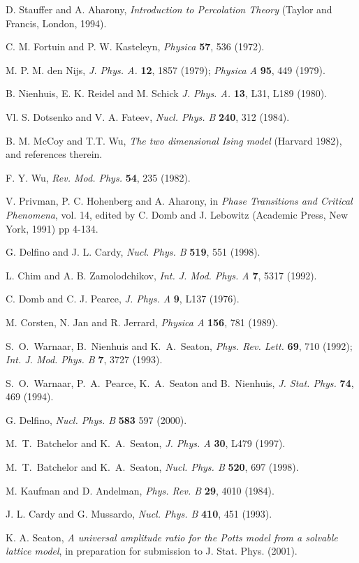 \documentclass[a4paper,a4paper]{article}
\begin{document}
 
\begin{thebibliography}{99}

D. Stauffer and A. Aharony, {\it Introduction to Percolation Theory} 
(Taylor and 
Francis, London, 1994).

 C. M. Fortuin and P. W. Kasteleyn, {\it Physica} {\bf 57}, 
536 (1972).

M. P. M. den Nijs, {\it J. Phys. A.} {\bf 12}, 1857 (1979);
{\it Physica A} {\bf 95}, 449 (1979).

B. Nienhuis, E. K. Reidel and M. Schick {\it J. Phys. A.} 
{\bf 13}, L31, L189 (1980).

 Vl. S. Dotsenko and V. A. Fateev, {\it Nucl. Phys. B} {\bf 240}, 
312 (1984).

 B. M. McCoy and T.T. Wu, {\it The two dimensional Ising model}
(Harvard 1982), and references therein.

 F. Y. Wu, {\it Rev. Mod. Phys.} {\bf 54}, 235 (1982).

 V. Privman, P. C. Hohenberg and A. Aharony,
in {\it Phase Transitions and Critical Phenomena}, vol. 14, edited by C. Domb
and J. Lebowitz (Academic Press, New York, 1991) pp 4-134.

 G. Delfino and J. L. Cardy, {\it  Nucl. Phys. B} 
{\bf 519}, 551 (1998).

 L. Chim and A. B. Zamolodchikov, {\it Int. J. Mod. Phys. A}
 {\bf 7}, 5317 (1992). 

 C. Domb and C. J. Pearce, {\it J. Phys. A} {\bf 9}, L137 (1976).

 M. Corsten, N. Jan and R. Jerrard, {\it Physica A} {\bf 156},
781 (1989).

S.~O.~Warnaar, B.~Nienhuis and K.~A.~Seaton,
{\it Phys. Rev. Lett.} {\bf 69}, 710 (1992); 
{\it Int. J. Mod. Phys. B} {\bf 7}, 3727 (1993).

S.~O.~Warnaar, P.~A.~Pearce, K.~A.~Seaton and B.~Nienhuis,
{\it J. Stat. Phys.} {\bf 74},  469 (1994).

 G. Delfino, {\it Nucl. Phys. B} {\bf 583} 597 (2000).

M.~T.~Batchelor and K.~A.~Seaton, {\it J. Phys. A} {\bf 30}, L479 (1997).

 M.~T.~Batchelor and K.~A.~Seaton,
{\it Nucl. Phys. B} {\bf 520}, 697 (1998).

 M. Kaufman and D. Andelman, {\it Phys. Rev. B}  {\bf 29}, 4010 
(1984).

 J. L. Cardy and G. Mussardo, 
{\it Nucl. Phys. B} {\bf 410}, 451 (1993).

 K. A. Seaton, {\it A universal amplitude ratio for
the \coordHE{} Potts model from a solvable lattice model}, in preparation for submission to J. Stat. Phys. (2001).





\end{thebibliography}
\end{document}
